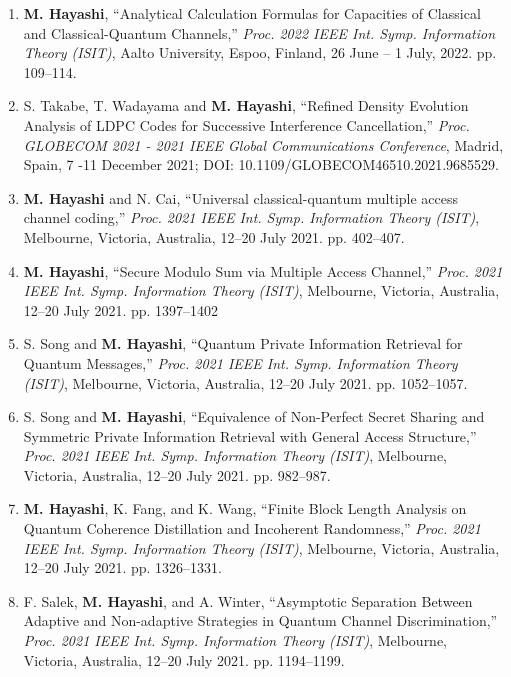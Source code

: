 \documentclass[a4paper,12pt,oneside]{article}
\begin{document}
\begin{enumerate}
    \item
    \textbf{M. Hayashi}, 
    ``Analytical Calculation Formulas for Capacities of Classical and Classical-Quantum Channels,''
    {\em Proc. 2022 IEEE Int. Symp. Information Theory (ISIT)}, 
    Aalto University, Espoo, Finland, 26 June – 1 July, 2022. pp. 109--114.

    \item
    S. Takabe, T. Wadayama and \textbf{M. Hayashi}, 
    ``Refined Density Evolution Analysis of LDPC Codes for Successive Interference Cancellation,''
    {\em Proc. GLOBECOM 2021 - 2021 IEEE Global Communications Conference}, 
    Madrid, Spain, 7 -11 December 2021; DOI: 10.1109/GLOBECOM46510.2021.9685529.

    \item
    \textbf{M. Hayashi} and N. Cai, 
    ``Universal classical-quantum multiple access channel
    coding,''
    {\em Proc. 2021 IEEE Int. Symp. Information Theory (ISIT)}, 
    Melbourne, Victoria, Australia, 12–20 July 2021. pp. 402–407.
    
    \item
    \textbf{M. Hayashi}, 
    ``Secure Modulo Sum via Multiple Access Channel,''
    {\em Proc. 2021 IEEE Int. Symp. Information Theory (ISIT)}, 
    Melbourne, Victoria, Australia, 12–20 July 2021. pp. 1397–1402
    
    \item
    S. Song and \textbf{M. Hayashi}, 
    ``Quantum Private Information Retrieval for Quantum Messages,''
    {\em Proc. 2021 IEEE Int. Symp. Information Theory (ISIT)}, 
    Melbourne, Victoria, Australia, 12–20 July 2021. pp. 1052–1057.
    
    \item
    S. Song and \textbf{M. Hayashi}, 
    ``Equivalence of Non-Perfect Secret Sharing and Symmetric Private Information Retrieval with General Access Structure,''
    {\em Proc. 2021 IEEE Int. Symp. Information Theory (ISIT)}, 
    Melbourne, Victoria, Australia, 12–20 July 2021. pp. 982–987.
    
    \item
    \textbf{M. Hayashi}, K. Fang, and K. Wang,
    ``Finite Block Length Analysis on Quantum
    Coherence Distillation and Incoherent Randomness,''
    {\em Proc. 2021 IEEE Int. Symp. Information Theory (ISIT)}, 
    Melbourne, Victoria, Australia, 12–20 July 2021. pp. 1326--1331.
    
    \item
    F. Salek, \textbf{M. Hayashi}, and A. Winter, 
    ``Asymptotic Separation Between Adaptive and Non-adaptive Strategies in Quantum Channel Discrimination,''
    {\em Proc. 2021 IEEE Int. Symp. Information Theory (ISIT)}, 
    Melbourne, Victoria, Australia, 12–20 July 2021. pp. 1194--1199.
    

\end{enumerate}
\end{document}

